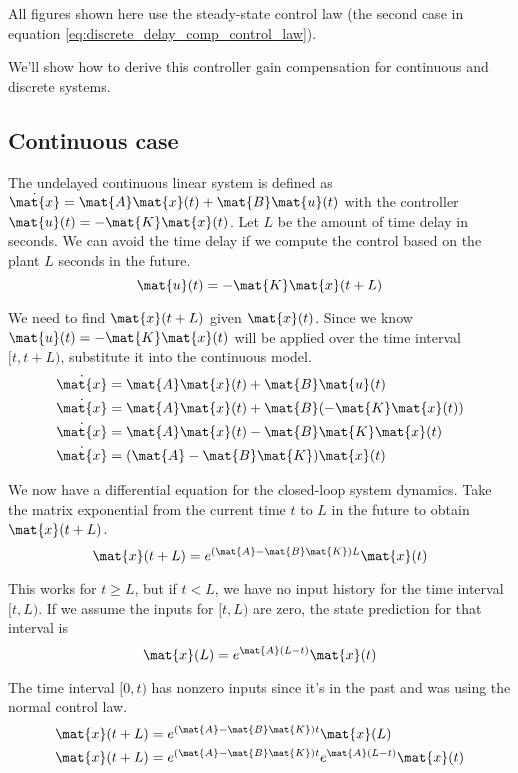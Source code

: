All figures shown here use the steady-state control law (the second case in
equation \eqref{eq:discrete_delay_comp_control_law}).

We'll show how to derive this controller gain compensation for continuous and
discrete systems.

\subsection{Continuous case}

The undelayed continuous linear system is defined as
$\dot{\mat{x}} = \mat{A}\mat{x}(t) + \mat{B}\mat{u}(t)$ with the controller
$\mat{u}(t) = -\mat{K}\mat{x}(t)$. Let $L$ be the amount of time delay in
seconds. We can avoid the time delay if we compute the control based on the
plant $L$ seconds in the future.
\begin{equation*}
  \mat{u}(t) = -\mat{K}\mat{x}(t + L)
\end{equation*}

We need to find $\mat{x}(t + L)$ given $\mat{x}(t)$. Since we know
$\mat{u}(t) = -\mat{K}\mat{x}(t)$ will be applied over the time interval
$[t, t + L)$, substitute it into the continuous model.
\begin{align*}
  \dot{\mat{x}} &= \mat{A}\mat{x}(t) + \mat{B}\mat{u}(t) \\
  \dot{\mat{x}} &= \mat{A}\mat{x}(t) + \mat{B}(-\mat{K}\mat{x}(t)) \\
  \dot{\mat{x}} &= \mat{A}\mat{x}(t) - \mat{B}\mat{K}\mat{x}(t) \\
  \dot{\mat{x}} &= (\mat{A} - \mat{B}\mat{K}) \mat{x}(t)
\end{align*}

We now have a differential equation for the closed-loop system dynamics. Take
the matrix exponential from the current time $t$ to $L$ in the future to obtain
$\mat{x}(t + L)$.
\begin{equation}
  \mat{x}(t + L) = e^{(\mat{A} - \mat{B}\mat{K})L} \mat{x}(t)
    \label{eq:continuous_advance_state_by_delay_post}
\end{equation}

This works for $t \geq L$, but if $t < L$, we have no input history for the time
interval $[t, L)$. If we assume the inputs for $[t, L)$ are zero, the state
prediction for that interval is
\begin{equation*}
  \mat{x}(L) = e^{\mat{A}(L - t)} \mat{x}(t)
\end{equation*}

The time interval $[0, t)$ has nonzero inputs since it's in the past and was
using the normal control law.
\begin{align}
  \mat{x}(t + L) &= e^{(\mat{A} - \mat{B}\mat{K})t} \mat{x}(L) \nonumber \\
  \mat{x}(t + L) &= e^{(\mat{A} - \mat{B}\mat{K})t} e^{\mat{A}(L - t)}
    \mat{x}(t) \label{eq:continuous_advance_state_by_delay_pre}
\end{align}

